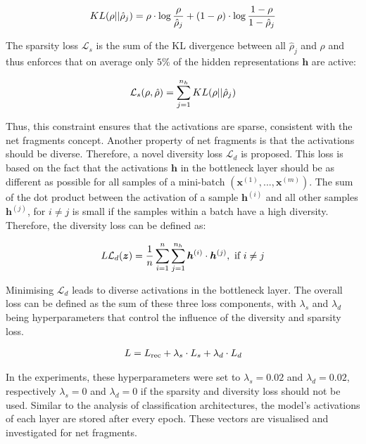 \begin{align}\eqlbl{ae_kld}
		KL(\rho || \hat{\rho}_j) = \rho \cdot \log \frac{\rho}{\hat{\rho}_j} + (1-\rho) \cdot \log \frac{1-\rho}{1-\hat{\rho}_j}
\end{align}

The sparsity loss $\mathcal{L}_{s}$ is the sum of the KL divergence between all $\hat{\rho}_j$ and $\rho$ and thus enforces that on average only $5\%$ of the hidden representations $\boldsymbol{h}$ are active:

\begin{align}\eqlbl{ae_kldl}
		\mathcal{L}_{s}(\rho, \hat{\rho}) = \sum_{j=1}^{n_h} KL(\rho || \hat{\rho}_j)
\end{align}

Thus, this constraint ensures that the activations are sparse, consistent with the net fragments concept.
Another property of net fragments is that the activations should be diverse.
Therefore, a novel diversity loss $\mathcal{L}_{d}$ is proposed.
This loss is based on the fact that the activations $\boldsymbol{h}$ in the bottleneck layer should be as different as possible for all samples of a mini-batch $(\boldsymbol{x}^{(1)}, ..., \boldsymbol{x}^{(m)})$.
The sum of the dot product between the activation of a sample $\boldsymbol{h}^{(i)}$ and all other samples $\boldsymbol{h}^{(j)}$, for $i \neq j$ is small if the samples within a batch have a high diversity. Therefore, the diversity loss can be defined as:

\begin{align}\eqlbl{ae_kldl2}
		L\mathcal{L}_{d}(\boldsymbol{z}) = \frac{1}{n} \sum_{i=1}^n\sum_{j=1}^{n_h} \boldsymbol{h}^{(i)} \cdot \boldsymbol{h}^{(j)}, \text{ if } i\neq j
\end{align}

Minimising $\mathcal{L}_{d}$ leads to diverse activations in the bottleneck layer. 
The overall loss can be defined as the sum of these three loss components, with $\lambda_s$ and $\lambda_d$ being hyperparameters that control the influence of the diversity and sparsity loss.

\begin{align}\eqlbl{ae_kldl3}
		L = L_{\text{rec}} + \lambda_s \cdot L_{s} + \lambda_d \cdot L_{d}
\end{align}

In the experiments, these hyperparameters were set to $\lambda_s = 0.02$ and $\lambda_d = 0.02$, respectively $\lambda_s = 0$ and $\lambda_d = 0$ if the sparsity and diversity loss should not be used.
Similar to the analysis of classification architectures, the model's activations of each layer are stored after every epoch.
These vectors are visualised and investigated for net fragments.

